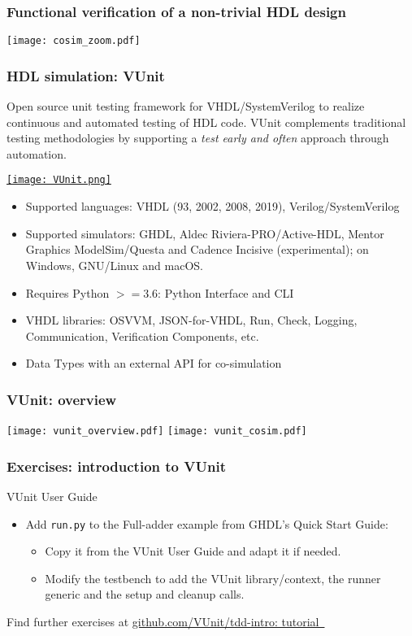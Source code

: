 \documentclass[xcolor={usenames,dvipsnames,svgnames}]{beamer}
\begin{document}
\begin{frame}
\frametitle{Functional verification of a non-trivial HDL design}
\centering
\texttt{[image: cosim\_zoom.pdf]}
\end{frame}

\begin{frame}
\frametitle{HDL simulation: VUnit}
\small
Open source unit testing framework for VHDL/SystemVerilog to realize continuous and automated testing of HDL code. VUnit complements traditional testing methodologies by supporting a \emph{test early and often} approach through automation.

\vfill
\href{https://vunit.github.io/}{\texttt{[image: VUnit.png]}}
\vfill

\tiny
\begin{itemize}
  \item Supported languages: VHDL (93, 2002, 2008, 2019), Verilog/SystemVerilog
  \item Supported simulators: GHDL, Aldec Riviera-PRO/Active-HDL, Mentor Graphics ModelSim/Questa and Cadence Incisive (experimental); on Windows, GNU/Linux and macOS.
  \item Requires Python $>=3.6$: Python Interface and CLI
  \item VHDL libraries: OSVVM, JSON-for-VHDL, Run, Check, Logging, Communication, Verification Components, etc.
  \item Data Types with an external API for co-simulation
\end{itemize}
\end{frame}

\begin{frame}
\frametitle{VUnit: overview}
\centering
\texttt{[image: vunit\_overview.pdf]}
\vfill
\texttt{[image: vunit\_cosim.pdf]}
\end{frame}

\begin{frame}
\frametitle{Exercises: introduction to VUnit}
\vfill
\begin{center}
VUnit User Guide \href{http://vunit.github.io/user_guide.html}{\faBook}
\end{center}
\vfill
\begin{itemize}
  \item Add \lstinline{run.py} to the Full-adder example from GHDL's Quick Start Guide:
  \begin{itemize}
    \item Copy it from the VUnit User Guide and adapt it if needed.
    \item Modify the testbench to add the VUnit library/context, the runner generic and the setup and cleanup calls.
  \end{itemize}
\end{itemize}
\vfill
Find further exercises at \href{https://github.com/VUnit/tdd-intro/tree/master/tutorial}{github.com/VUnit/tdd-intro: tutorial~\faGithub}
\vfill
\end{frame}
\end{document}
